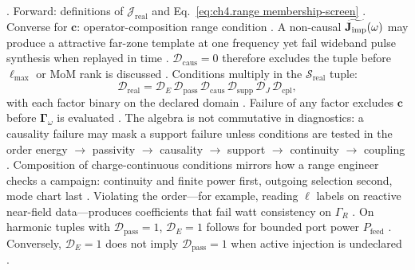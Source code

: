 \cite{devaney2004}.
Forward: definitions of \(\mathcal{J}_{\mathrm{real}}\) and Eq.~\eqref{eq:ch4.range membership-screen}
\cite{stratton1941}. Converse for \(\mathbf{c}\): operator-composition range condition
\cite{harrington2001}.
A non-causal \(\widetilde{\mathbf{J}_{\mathrm{imp}}}(\omega)\) may produce a attractive far-zone template at one frequency yet fail
wideband pulse synthesis when replayed in time \cite{jackson1999}. \(\mathcal{D}_{\mathrm{caus}}=0\)
therefore excludes the tuple before \(\ell_{\max}\) or MoM rank is discussed \cite{harrington2001}.
Conditions multiply in the $\mathcal{S}_{\mathrm{real}}$ tuple:
\begin{equation}
\label{eq:ch4.condition-composition-algebra}
\mathcal{D}_{\mathrm{real}}
=
\mathcal{D}_{E}\,
\mathcal{D}_{\mathrm{pass}}\,
\mathcal{D}_{\mathrm{caus}}\,
\mathcal{D}_{\mathrm{supp}}\,
\mathcal{D}_{J}\,
\mathcal{D}_{\mathrm{cpl}},
\end{equation}
with each factor binary on the declared domain \cite{stratton1941}. Failure of any factor excludes
\(\mathbf{c}\) before \(\boldsymbol{\Gamma}_\omega\) is evaluated \cite{devaney2004}. The algebra is not commutative in
diagnostics: a causality failure may mask a support failure unless conditions are tested in the order
energy \(\rightarrow\) passivity \(\rightarrow\) causality \(\rightarrow\) support \(\rightarrow\) continuity \(\rightarrow\) coupling
\cite{harrington2001}.
Composition of charge-continuous conditions mirrors how a range engineer checks a campaign: continuity and finite power first, outgoing selection second, mode chart last \cite{stratton1941}. Violating the order---for example, reading $\ell$ labels on reactive near-field data---produces coefficients that fail watt consistency on $\Gamma_R$ \cite{jackson1999}.
\label{lem:ch4.passivity-finite-energy}
On harmonic tuples with \(\mathcal{D}_{\mathrm{pass}}=1\), \(\mathcal{D}_{E}=1\) follows for bounded port power
\(P_{\mathrm{feed}}\) \cite{stratton1941}. Conversely, \(\mathcal{D}_{E}=1\) does not imply
\(\mathcal{D}_{\mathrm{pass}}=1\) when active injection is undeclared \cite{harrington2001}.
